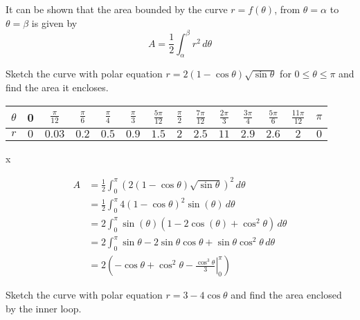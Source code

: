 	It can be shown that the area bounded by the curve $r=f(\theta)$, from $\theta = \alpha$ to $\theta = \beta$ is given by \[A = \frac12\int_\alpha^\beta r^2\,d\theta\]
	\hrulefill
	\newpage
	\begin{example}
		Sketch the curve with polar equation $r=2(1-\cos\theta)\sqrt{\sin\theta}$ for $0 \leq \theta\leq \pi$ and find the area it encloses.
	\end{example}
	\begin{center}
		\begin{tabular}{c|c|c|c|c|c|c|c|c|c|c|c|c|c}
			$\theta$ & 0   & $\frac{\pi}{12}$ & $\frac{\pi}6$ & $\frac{\pi}4$ & $\frac{\pi}3$ & $\frac{5\pi}{12}$ & $\frac\pi2$ & $\frac{7\pi}{12}$ & $\frac{2\pi}3$ & $\frac{3\pi}4$ & $\frac{5\pi}6$ & $\frac{11\pi}{12}$ & $\pi$ \\ \hline
			$r$      & $0$ & $0.03$           & $0.2$         & $0.5$         & $0.9$         & $1.5$             & $2$         & $2.5$             & $11$           & $2.9$          & $2.6$          & $2$                & $0$   
		\end{tabular}
	\end{center}
	
	\begin{fullPlot}{-3}{2}{-2}{3}x
	\end{fullPlot}
	\begin{align*}
	A & =\frac12\int_0^\pi \left(2(1-\cos\theta)\sqrt{\sin\theta}\right)^2\,d\theta             \\
	& = \frac12\int_0^\pi 4(1-\cos\theta)^2\sin(\theta)\,d\theta                                \\
	& = 2\int_0^\pi \sin(\theta)(1-2\cos(\theta)+\cos^2\theta)\,d\theta\\
	&= 2\int_0^\pi \sin\theta - 2\sin\theta\cos\theta+\sin\theta\cos^2\theta\,d\theta\\
	&= 2\left(\left.-\cos\theta + \cos^2\theta - \frac{\cos^3\theta}{3}\right|_0^\pi\right)
	\end{align*}
	\newpage
	\begin{example}
		Sketch the curve with polar equation $r=3-4\cos\theta$ and find the area enclosed by the inner loop.
	\end{example}
	
	

